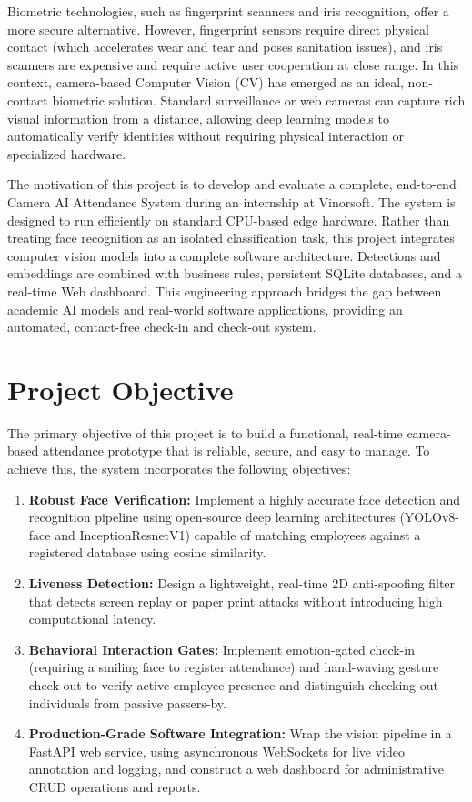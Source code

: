 Biometric technologies, such as fingerprint scanners and iris recognition, offer a more secure alternative. However, fingerprint sensors require direct physical contact (which accelerates wear and tear and poses sanitation issues), and iris scanners are expensive and require active user cooperation at close range. In this context, camera-based Computer Vision (CV) has emerged as an ideal, non-contact biometric solution. Standard surveillance or web cameras can capture rich visual information from a distance, allowing deep learning models to automatically verify identities without requiring physical interaction or specialized hardware.

The motivation of this project is to develop and evaluate a complete, end-to-end Camera AI Attendance System during an internship at Vinorsoft. The system is designed to run efficiently on standard CPU-based edge hardware. Rather than treating face recognition as an isolated classification task, this project integrates computer vision models into a complete software architecture. Detections and embeddings are combined with business rules, persistent SQLite databases, and a real-time Web dashboard. This engineering approach bridges the gap between academic AI models and real-world software applications, providing an automated, contact-free check-in and check-out system.

\section{Project Objective}
The primary objective of this project is to build a functional, real-time camera-based attendance prototype that is reliable, secure, and easy to manage. To achieve this, the system incorporates the following objectives:
\begin{enumerate}
    \item \textbf{Robust Face Verification:} Implement a highly accurate face detection and recognition pipeline using open-source deep learning architectures (YOLOv8-face and InceptionResnetV1) capable of matching employees against a registered database using cosine similarity.
    \item \textbf{Liveness Detection:} Design a lightweight, real-time 2D anti-spoofing filter that detects screen replay or paper print attacks without introducing high computational latency.
    \item \textbf{Behavioral Interaction Gates:} Implement emotion-gated check-in (requiring a smiling face to register attendance) and hand-waving gesture check-out to verify active employee presence and distinguish checking-out individuals from passive passers-by.
    \item \textbf{Production-Grade Software Integration:} Wrap the vision pipeline in a FastAPI web service, using asynchronous WebSockets for live video annotation and logging, and construct a web dashboard for administrative CRUD operations and reports.
\end{enumerate}

